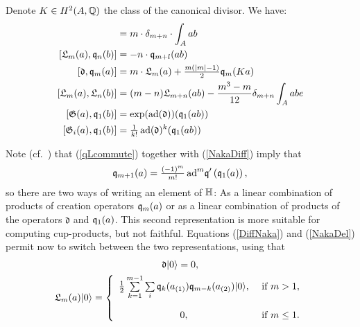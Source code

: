 \begin{lemma}\cite[Thm.~2.16]{LiQinWang} Denote $K\in H^2(A,\mathbb{Q})$ the class of the canonical divisor. We have:
\begin{align}
[\q_m(a), \q_n(b)] &= m\cdot \delta_{m+n} \cdot \int_A ab \\
\label{qLcommute}
[\mathfrak{L}_m(a),\q_n(b)] &= -n\cdot \q_{m+l}(ab) \\
\label{DiffNaka}
[\mathfrak{d},\q_m(a)] &= m \cdot \mathfrak{L}_m(a) + \tfrac{m(|m|-1)}{2} \q_m(K a) \\
[\mathfrak{L}_m(a),\mathfrak{L}_n(b)] &= (m-n) \mathfrak{L}_{m+n}(ab) - \frac{m^3-m}{12} \delta_{m+n}\int_A abe \\
[\G(a),\q_1(b)] &= \exp(\ad(\mathfrak{d}))(\q_1(a b) ) \\
[\G_i(a),\q_1(b)] &= \tfrac{1}{k!} \ad(\mathfrak{d})^k(\q_1(a b) ) 
\end{align}
\end{lemma}
\begin{remark}\label{HRep}
Note (cf.~\cite[Thm.~3.8]{LehnSorger}) that (\ref{qLcommute}) together with (\ref{NakaDiff}) imply that 
\begin{equation}\label{NakaDel}
\mathfrak{q}_{m+1}(a) = \tfrac{(-1)^m}{m!}\operatorname{ad}^m\!\mathfrak{q}'\left(\mathfrak{q}_1(a)\right),
\end{equation}
so there are two ways of writing an element of $\mathbb{H}$: As a linear combination of products of creation operators $\mathfrak{q}_m(a)$ or as a linear combination of products of the operators $\mathfrak{d}$ and $\mathfrak{q}_1(a)$. This second representation is more suitable for computing cup-products, but not faithful. 
Equations (\ref{DiffNaka}) and (\ref{NakaDel}) permit now to switch between the two representations, using that
\begin{gather}
\mathfrak{d} \vac = 0 ,  \\
\mathfrak{L}_m(a) \vac = \left\{ 
\begin{array}{cl}
 \tfrac{1}{2}\sum\limits_{k=1}^{m-1}\sum\limits_{i}\q_k(a_{(1)})\q_{m-k}(a_{(2)})\vac, & \text{ if } m>1, \vspace{4mm}\\
 0, & \text{ if } m\leq 1. \\
\end{array}
\right.\\
\end{gather}
\end{remark}

